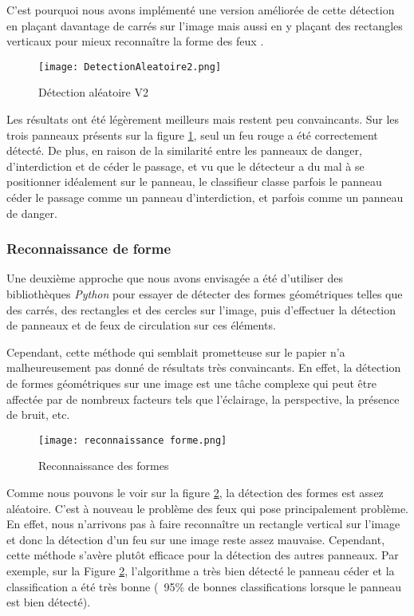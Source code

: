 \documentclass[twocolumn,10pt]{article}
\begin{document}
    C'est pourquoi nous avons implémenté une version améliorée de cette détection en plaçant davantage de carrés sur l'image mais aussi en y plaçant des rectangles verticaux pour mieux reconnaître la forme des feux .
    \begin{figure}
        \centering
        \texttt{[image: DetectionAleatoire2.png]}
        \caption{Détection aléatoire V2}
        \label{fig:detection-aleatoire-v2}
    \end{figure}

    Les résultats ont été légèrement meilleurs mais restent peu convaincants. Sur les trois panneaux présents sur la figure  \ref{fig:detection-aleatoire-v2}, seul un feu rouge a été correctement détecté. De plus, en raison de la similarité entre les panneaux de danger, d'interdiction et de céder le passage, et vu que le détecteur a du mal à se positionner idéalement sur le panneau, le classifieur classe parfois le panneau céder le passage comme un panneau d'interdiction, et parfois comme un panneau de danger.


    \subsubsection{Reconnaissance de forme}
    Une deuxième approche que nous avons envisagée a été d'utiliser des bibliothèques \textit{Python} pour essayer de détecter des formes géométriques telles que des carrés, des rectangles et des cercles sur l'image, puis d'effectuer la détection de panneaux et de feux de circulation sur ces éléments.

    Cependant, cette méthode qui semblait prometteuse sur le papier n'a malheureusement pas donné de résultats très convaincants. En effet, la détection de formes géométriques sur une image est une tâche complexe qui peut être affectée par de nombreux facteurs tels que l'éclairage, la perspective, la présence de bruit, etc.
    \begin{figure}
        \centering
        \texttt{[image: reconnaissance forme.png]}
        \caption{Reconnaissance des formes}
        \label{fig:reconnaissance-formes}
    \end{figure}

    Comme nous pouvons le voir sur la figure \ref{fig:reconnaissance-formes}, la détection des formes est assez aléatoire. C'est à nouveau le problème des feux qui pose principalement problème. En effet, nous n'arrivons pas à faire reconnaître un rectangle vertical sur l'image et donc la détection d'un feu sur une image reste assez mauvaise. Cependant, cette méthode s'avère plutôt efficace pour la détection des autres panneaux. Par exemple, sur la Figure \ref{fig:reconnaissance-formes}, l'algorithme a très bien détecté le panneau céder et la classification a été très bonne (~95\% de bonnes classifications lorsque le panneau est bien détecté).
\end{document}
